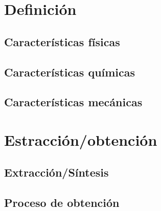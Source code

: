 \section {Definición}

	\subsection {Características físicas}

	\subsection {Características químicas}

	\subsection {Características mecánicas}

\section {Estracción/obtención}

	\subsection {Extracción/Síntesis}

	\subsection {Proceso de obtención}
